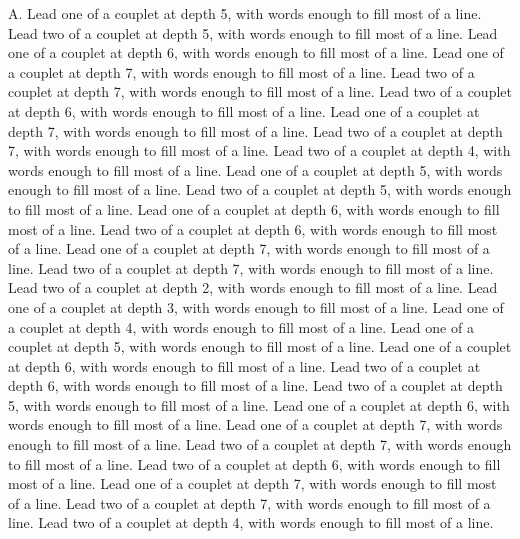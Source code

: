 \documentclass[a4paper]{article}
\begin{document}
\begin{Key}{A. }
\alter Lead one of a couplet at depth 5, with words enough to fill most of a line.
\alter Lead two of a couplet at depth 5, with words enough to fill most of a line.
\alter Lead one of a couplet at depth 6, with words enough to fill most of a line.
\alter Lead one of a couplet at depth 7, with words enough to fill most of a line.
\alter Lead two of a couplet at depth 7, with words enough to fill most of a line.
\alter Lead two of a couplet at depth 6, with words enough to fill most of a line.
\alter Lead one of a couplet at depth 7, with words enough to fill most of a line.
\alter Lead two of a couplet at depth 7, with words enough to fill most of a line.
\alter Lead two of a couplet at depth 4, with words enough to fill most of a line.
\alter Lead one of a couplet at depth 5, with words enough to fill most of a line.
\alter Lead two of a couplet at depth 5, with words enough to fill most of a line.
\alter Lead one of a couplet at depth 6, with words enough to fill most of a line.
\alter Lead two of a couplet at depth 6, with words enough to fill most of a line.
\alter Lead one of a couplet at depth 7, with words enough to fill most of a line.
\alter Lead two of a couplet at depth 7, with words enough to fill most of a line.
\alter Lead two of a couplet at depth 2, with words enough to fill most of a line.
\alter Lead one of a couplet at depth 3, with words enough to fill most of a line.
\alter Lead one of a couplet at depth 4, with words enough to fill most of a line.
\alter Lead one of a couplet at depth 5, with words enough to fill most of a line.
\alter Lead one of a couplet at depth 6, with words enough to fill most of a line.
\alter Lead two of a couplet at depth 6, with words enough to fill most of a line.
\alter Lead two of a couplet at depth 5, with words enough to fill most of a line.
\alter Lead one of a couplet at depth 6, with words enough to fill most of a line.
\alter Lead one of a couplet at depth 7, with words enough to fill most of a line.
\alter Lead two of a couplet at depth 7, with words enough to fill most of a line.
\alter Lead two of a couplet at depth 6, with words enough to fill most of a line.
\alter Lead one of a couplet at depth 7, with words enough to fill most of a line.
\alter Lead two of a couplet at depth 7, with words enough to fill most of a line.
\alter Lead two of a couplet at depth 4, with words enough to fill most of a line.

\end{Key}
\end{document}
